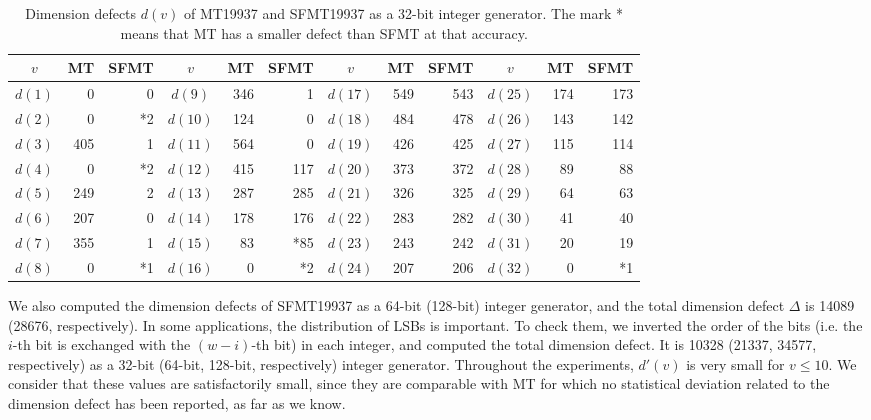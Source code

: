 \documentclass{svmult}
\begin{document}
\begin{table}
\begin{center}
\begin{tabular}{|c|rr||c|rr||c|rr||c|rr|} \hline
$v$ & MT & SFMT & $v$ & MT & SFMT & $v$ & MT & SFMT & $v$ & MT & SFMT\\ \hline
$d(1)$ & 0 & 0 & $d(9)$ & 346 & 1 & $d(17)$ & 549 & 543 & $d(25)$ & 174 & 173 \\
$d(2)$ & 0 & *2 & $d(10)$ & 124 & 0 & $d(18)$ & 484 & 478 & $d(26)$ & 143 & 142
\\
$d(3)$ & 405 & 1 & $d(11)$ & 564 & 0 & $d(19)$ & 426 & 425 & $d(27)$ & 115 & 114
\\
$d(4)$ & 0 & *2 & $d(12)$ & 415 & 117 & $d(20)$ & 373 & 372 & $d(28)$ & 89 & 88
\\
$d(5)$ & 249 & 2 & $d(13)$ & 287 & 285 & $d(21)$ & 326 & 325 & $d(29)$ & 64 & 63
\\
$d(6)$ & 207 & 0 & $d(14)$ & 178 & 176 & $d(22)$ & 283 & 282 & $d(30)$ & 41 & 40
\\
$d(7)$ & 355 & 1 & $d(15)$ & 83 & *85 & $d(23)$ & 243 & 242 & $d(31)$ & 20 & 19 
\\
$d(8)$ & 0 & *1 & $d(16)$ & 0 & *2 & $d(24)$ & 207 & 206 & $d(32)$ & 0 & *1 \\
\hline
\end{tabular}
\end{center}
\caption{Dimension defects 
$d(v)$ of MT19937 and SFMT19937
as a 32-bit integer generator. 
The mark * means that MT has a smaller defect than SFMT
at that accuracy.
}\label{tab:dd}
\end{table}


We also computed the dimension defects of SFMT19937 as a 64-bit
(128-bit) integer generator, and the total dimension 
defect $\Delta$ is 14089 (28676, respectively). In some applications, 
the distribution of LSBs is important. 
To check them, we inverted the order of the bits (i.e. the $i$-th
bit is exchanged with the $(w-i)$-th bit) in each integer, 
and computed the total dimension defect. It is
10328 (21337, 34577, respectively) as
a 32-bit (64-bit, 128-bit, respectively) integer generator.
Throughout the experiments, $d'(v)$ is very small for $v\leq 10$.
We consider that these values are satisfactorily small, since
they are comparable with MT
for which no statistical deviation
related to the dimension defect has been reported, 
as far as we know.
\end{document}
